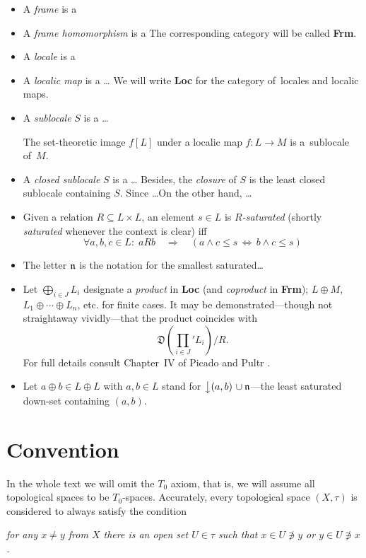 \begin{itemize}
\item A \emph{frame} is a
\item A \emph{frame homomorphism} is a
The corresponding category will be called {\bf Frm}.
\item A \emph{locale} is a
\item A \emph{localic map} is a \ldots
We will write {\bf Loc} for the category of~locales and localic maps.
\item A \emph{sublocale} $S$ is a \ldots
  \begin{fact}
    The set-theoretic image $f[L]$ under a localic map $f\colon L\to M$
    is a~sublocale of~$M$.
  \end{fact}
\item A \emph{closed sublocale} $S$ is a \ldots
Besides, the \emph{closure} of $S$ is the least closed sublocale containing $S$.
Since \ldots On the other hand, \ldots
\item Given a relation $R\subseteq L \times L$, an element $s\in L$ is
\emph{$R$-saturated} (shortly \emph{saturated} whenever the context is clear)
  iff
\[
  \forall a, b, c\in L: \; aRb \quad \Rightarrow \quad \left( a \wedge c \leq s
  \, \Leftrightarrow \, b \wedge c \leq s \right)
\]
\item The letter $\mathfrak{n}$ is the notation for the smallest saturated\ldots
\item Let $\bigoplus_{i\in J} L_i$ designate a \emph{product} in {\bf Loc} (and
\emph{coproduct} in {\bf Frm}); $L \oplus M$, $L_1 \oplus\cdots\oplus L_n$, etc.
for finite cases.
It may be demonstrated---though not straightaway vividly---that the product
coincides with
\[
  \textstyle\mathfrak{D}\left(\prod_{i\in J}\nolimits' L_{i}\right)/R.
\]
For full details consult Chapter~IV of Picado and Pultr \cite{picado-pultr12}.
\item Let $a \oplus b \in L \oplus L$ with $a, b\in L$ stand for
$\left\downarrow (a, b) \right. \cup \mathfrak{n}$---the least saturated down-set
containing $(a, b)$.
\end{itemize}

\section*{Convention}

In the whole text we will omit the $T_0$ axiom, that is, we will assume all
topological spaces to be $T_0$-spaces.
Accurately, every topological space $(X, \tau)$ is considered to always satisfy
the condition
\begin{center} \it
  for any $x \ne y$ from $X$ there is an open set $U \in \tau$ such that $x \in U
  \not\owns y$ or $y \in U \not\owns x$.
\end{center}
